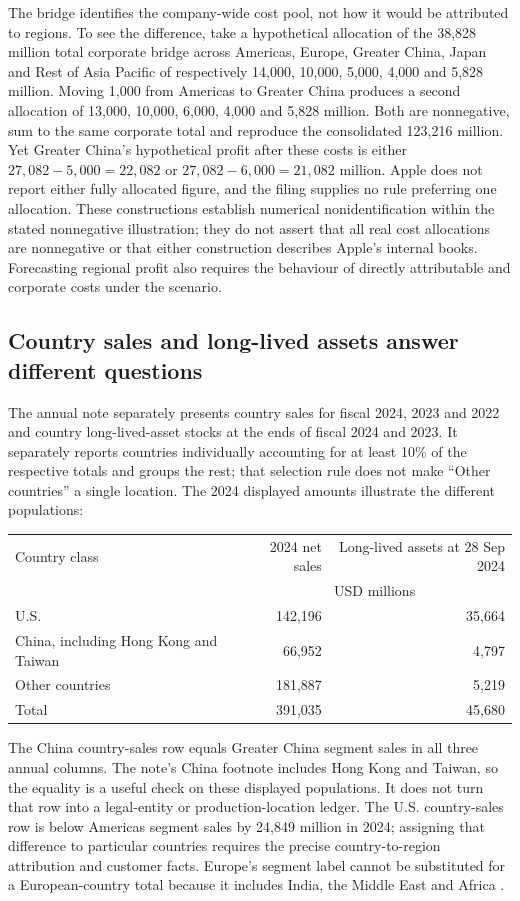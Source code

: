 The bridge identifies the company-wide cost pool, not how it would be
attributed to regions. To see the difference, take a hypothetical allocation
of the 38,828 million total corporate bridge across Americas, Europe, Greater
China, Japan and Rest of Asia Pacific of respectively 14,000, 10,000, 5,000,
4,000 and 5,828 million. Moving 1,000 from Americas to Greater China produces
a second allocation of 13,000, 10,000, 6,000, 4,000 and 5,828 million.
Both are nonnegative, sum to the same corporate total and reproduce the
consolidated 123,216 million. Yet Greater China's hypothetical profit after
these costs is either $27{,}082-5{,}000=22{,}082$ or
$27{,}082-6{,}000=21{,}082$ million. Apple does not report either fully
allocated figure, and the filing supplies no rule preferring one allocation.
These constructions establish numerical nonidentification within the stated
nonnegative illustration; they do not assert that all real cost allocations
are nonnegative or that either construction describes Apple's internal books.
Forecasting regional profit also requires the behaviour of directly
attributable and corporate costs under the scenario.

\subsection{Country sales and long-lived assets answer different questions}

The annual note separately presents country sales for fiscal 2024, 2023 and
2022 and country long-lived-asset stocks at the ends of fiscal 2024 and 2023.
It separately reports countries individually accounting for at least 10\% of
the respective totals and groups the rest; that selection rule does not make
``Other countries'' a single location. The 2024 displayed amounts illustrate
the different populations:
\begin{center}
\begin{tabular}{lrr}
\toprule
Country class & 2024 net sales & Long-lived assets at 28 Sep 2024\\
& \multicolumn{2}{c}{USD millions}\\\midrule
U.S. & 142,196 & 35,664\\
China, including Hong Kong and Taiwan & 66,952 & 4,797\\
Other countries & 181,887 & 5,219\\\midrule
Total & 391,035 & 45,680\\\bottomrule
\end{tabular}
\end{center}
The China country-sales row equals Greater China segment sales in all three
annual columns. The note's China footnote includes Hong Kong and Taiwan, so
the equality is a useful check on these displayed populations. It does not
turn that row into a legal-entity or production-location ledger. The U.S.
country-sales row is below Americas segment sales by 24,849 million in 2024;
assigning that difference to particular countries requires the precise
country-to-region attribution and customer facts. Europe's segment label
cannot be substituted for a European-country total because it includes India,
the Middle East and Africa \citep[Note 13, printed pp.~46--47]{apple2024}.

